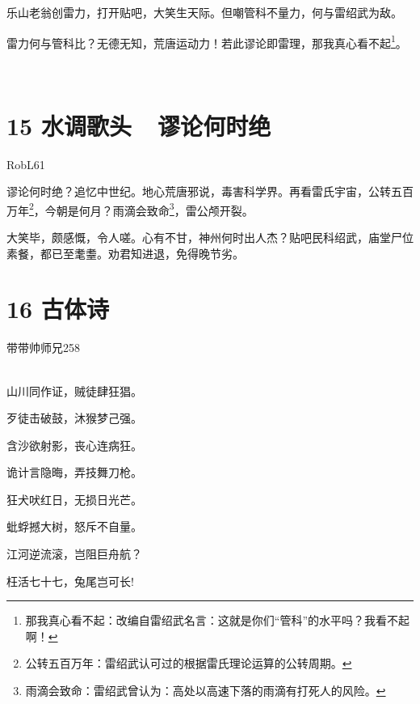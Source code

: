 \documentclass[UTF8,12pt,oneside]{ctexbook}
\begin{document}
        乐山老翁创雷力，打开贴吧，大笑生天际。但嘲管科不量力，何与雷绍武为敌。
        
        雷力何与管科比？无德无知，荒唐运动力！若此谬论即雷理，那我真心看不起\footnote{那我真心看不起：改编自雷绍武名言：这就是你们“管科”的水平吗？我看不起啊！}。
    
    ~\\
    \section{15 水调歌头\ \ 谬论何时绝}
    \begin{center}
        RobL61
        
    \end{center}
    
        谬论何时绝？追忆中世纪。地心荒唐邪说，毒害科学界。再看雷氏宇宙，公转五百万年\footnote{公转五百万年：雷绍武认可过的根据雷氏理论运算的公转周期。}，今朝是何月？雨滴会致命\footnote{雨滴会致命：雷绍武曾认为：高处以高速下落的雨滴有打死人的风险。}，雷公颅开裂。
        
        大笑毕，颇感慨，令人嗟。心有不甘，神州何时出人杰？贴吧民科绍武，庙堂尸位素餐，都已至耄耋。劝君知进退，免得晚节劣。
        ~\\
    
    \newpage
    
    \section{16 古体诗}
    \begin{center}
        带带帅师兄258
        
        ~\\
        山川同作证，贼徒肆狂猖。
        
        歹徒击破鼓，沐猴梦己强。
        
        含沙欲射影，丧心连病狂。
        
        诡计言隐晦，弄技舞刀枪。
        
        狂犬吠红日，无损日光芒。
        
        蚍蜉撼大树，怒斥不自量。
        
        江河逆流滚，岂阻巨舟航？
        
        枉活七十七，兔尾岂可长!
        
    \end{center}
    
\end{document}

